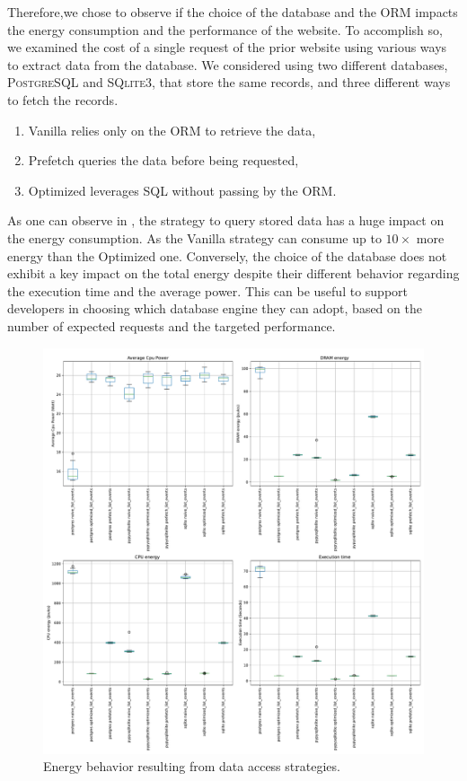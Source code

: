 Therefore,we chose to observe if the choice of the database and the ORM impacts the energy consumption and the performance of the website.
To accomplish so, we examined the cost of a single request of the prior website using various ways to extract data from the database.
We considered using two different databases, \textsc{PostgreSQL} and \textsc{SQlite3}, that store the same records, and three different ways to fetch the records.
\begin{enumerate}
    \item \textsf{Vanilla} relies only on the ORM to retrieve the data,
    \item \textsf{Prefetch} queries the data before being requested,
    \item \textsf{Optimized} leverages SQL without passing by the ORM.
\end{enumerate}


As one can observe in , the strategy to query stored data has a huge impact on the energy consumption.
As the \textsf{Vanilla} strategy can consume up to $10\times$ more energy than the \textsf{Optimized} one.
Conversely, the choice of the database does not exhibit a key impact on the total energy despite their different behavior regarding the execution time and the average power.
This can be useful to support developers in choosing which database engine they can adopt, based on the number of expected requests and the targeted performance.

\begin{figure}[!hbt]
    \centering
    \includegraphics[width=\linewidth]{imgs/django}
    \caption{Energy behavior resulting from data access strategies.}
    \label{fig:django}
\end{figure}

